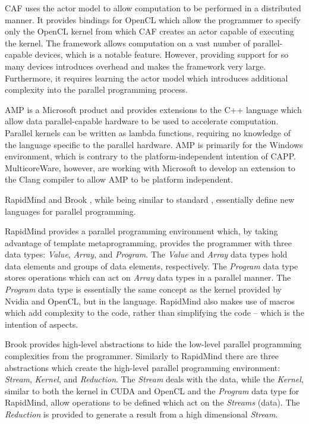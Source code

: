\documentclass{sig-alternate-05-2015}
\begin{document}
CAF \cite{schmidt:actor, schmidt:actor1} uses the actor model to allow
computation to be performed in a distributed manner. It provides bindings for
OpenCL which allow the programmer to specify only the OpenCL kernel from which
CAF creates an actor capable of executing the kernel. The framework allows
computation on a vast number of parallel-capable devices, which is a notable
feature. However, providing support for so many devices introduces overhead and makes 
the framework very large. Furthermore, it requires learning the actor model 
which introduces additional complexity into the parallel programming process.

\CPP AMP \cite{microsoft:amp} is a Microsoft product and provides extensions to the C++ language which allow 
data parallel-capable hardware to be used to accelerate computation. Parallel kernels can be written as \CPP
lambda functions, requiring no knowledge of the language specific to the parallel hardware. \CPP AMP is
primarily for the Windows environment, which is contrary to the platform-independent intention of CAPP.
MulticoreWare, however, are working with Microsoft to develop an extension to the Clang compiler to allow \CPP
AMP to be platform independent.

RapidMind \cite{rapidmind} and Brook \cite{brook}, while being similar to standard
\CPP, essentially define new languages for parallel programming.

RapidMind provides a parallel programming environment which, by
taking advantage of \CPP template metaprogramming, provides the programmer 
with three data types: \textit{Value}, \textit{Array}, and \textit{Program}.
The \textit{Value} and \textit{Array} data types hold data elements and 
groups of data elements, respectively. The \textit{Program} data type stores
operations which can act on \textit{Array} data types in a parallel manner.
The \textit{Program} data type is essentially the same concept as the kernel 
provided  by Nvidia and OpenCL, but in the \CPP language. RapidMind also makes 
use of macros which add complexity to the code, rather than simplifying the code
-- which is the intention of aspects.

Brook provides high-level abstractions to hide the low-level parallel
programming complexities from the programmer. Similarly to RapidMind there 
are three abstractions which create the high-level parallel programming 
environment: \textit{Stream}, \textit{Kernel}, and \textit{Reduction}. The 
\textit{Stream} deals with the data, while the \textit{Kernel}, similar to both 
the kernel in CUDA and OpenCL and the \textit{Program} data type for 
RapidMind, allow operations to be defined which act on the \textit{Streams} (data). 
The \textit{Reduction} is provided to generate a result from a high dimensional 
\textit{Stream}.
\end{document}
